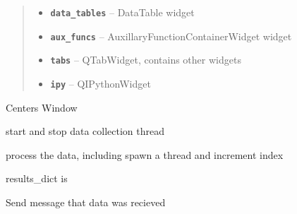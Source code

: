 \documentclass[letterpaper,10pt,english]{sphinxmanual}
\begin{document}
\begin{fulllineitems}
\begin{quote}
\begin{description}
\begin{itemize}
\item {} 
\textbf{\texttt{data\_tables}} -- DataTable widget

\item {} 
\textbf{\texttt{aux\_funcs}} -- AuxillaryFunctionContainerWidget widget

\item {} 
\textbf{\texttt{tabs}} -- QTabWidget, contains other widgets

\item {} 
\textbf{\texttt{ipy}} -- QIPythonWidget

\end{itemize}

\end{description}\end{quote}

\begin{fulllineitems}
\label{MainWindow:SpinorMonitor.MainWindow.center}
Centers Window

\end{fulllineitems}


\begin{fulllineitems}
\label{MainWindow:SpinorMonitor.MainWindow.change_state}
start and stop data collection thread

\end{fulllineitems}


\begin{fulllineitems}
\label{MainWindow:SpinorMonitor.MainWindow.data_process}
process the data, including spawn a thread and increment index

results\_dict is

\end{fulllineitems}


\begin{fulllineitems}
\label{MainWindow:SpinorMonitor.MainWindow.data_recieved}
Send message that data was recieved


\end{fulllineitems}
\end{fulllineitems}
\end{document}
